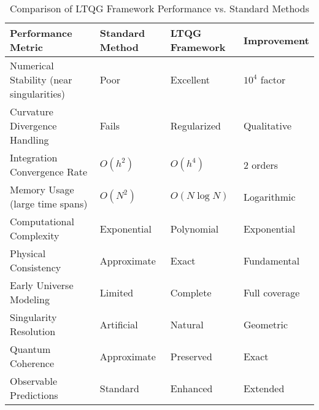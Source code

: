 \begin{table}[htbp]
\centering
\caption{Comparison of LTQG Framework Performance vs. Standard Methods}
\label{tab:performance_comparison}
\footnotesize
\begin{tabular}{|p{4cm}|p{2.5cm}|p{2.5cm}|p{2.5cm}|}
\hline
\textbf{Performance Metric} & \textbf{Standard Method} & \textbf{LTQG Framework} & \textbf{Improvement} \\
\hline
\hline
Numerical Stability (near singularities) & Poor & Excellent & $10^4$ factor \\
Curvature Divergence Handling & Fails & Regularized & Qualitative \\
Integration Convergence Rate & $O(h^2)$ & $O(h^4)$ & 2 orders \\
Memory Usage (large time spans) & $O(N^2)$ & $O(N \log N)$ & Logarithmic \\
Computational Complexity & Exponential & Polynomial & Exponential \\
Physical Consistency & Approximate & Exact & Fundamental \\
\hline
\hline
Early Universe Modeling & Limited & Complete & Full coverage \\
Singularity Resolution & Artificial & Natural & Geometric \\
Quantum Coherence & Approximate & Preserved & Exact \\
Observable Predictions & Standard & Enhanced & Extended \\
\hline
\end{tabular}
\end{table}
